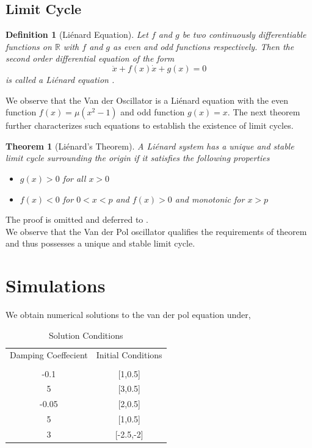 \documentclass[11pt]{article}
\newtheorem{thm}{Theorem}
\newtheorem{deftn}{Definition}
\begin{document}
\subsection*{Limit Cycle}
\begin{deftn}[Li\'enard Equation]
Let $f$ and $g$ be two continuously differentiable functions on $\mathbb{R}$ with $f$ and $g$ as even and odd functions respectively. Then the second order differential equation of the form $$ \ddot{x}+f(x)\dot{x}+g(x)=0$$ is called a Li\'enard equation \cite{belur}.
\end{deftn}
We observe that the Van der Oscillator is a Li\'enard equation with the even function $f(x)=\mu(x^2-1)$ and odd function $g(x)=x$.  The next theorem further characterizes such equations to establish the existence of limit cycles.
\begin{thm}[Li\'enard's Theorem]
A Li\'enard system has a unique and stable limit cycle surrounding the origin if it satisfies the following properties
\begin{itemize}
\item $g(x) >0$ for all $x >0$
\item $f(x)<0$ for $0<x<p$ and $f(x)>0$ and monotonic for $x>p$
\end{itemize}
\end{thm} 
The proof is omitted and deferred to \cite{Lienard}.\\
We observe that the Van der Pol oscillator qualifies the requirements of theorem and thus possesses a unique and stable limit cycle. 
\section{Simulations}
We obtain numerical solutions to the van der pol equation under,
\begin{table}[H]
\centering
\begin{tabular}{| c | c |}
\hline
 Damping Coeffecient & Initial Conditions \\
 &\\\hline
 -0.1 & [1,0.5] \\\hline
 5 & [3,0.5] \\\hline
 -0.05 & [2,0.5] \\\hline
 5 & [1,0.5] \\\hline
 3 & [-2.5,-2] \\\hline
 \end{tabular}
\caption{Solution Conditions}
\end{table}
\end{document}

